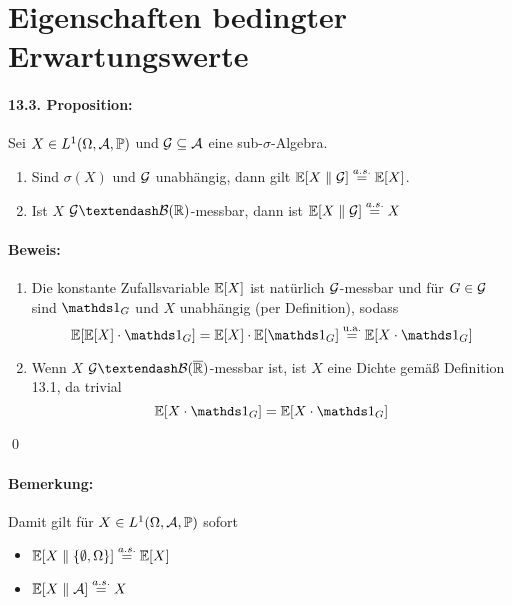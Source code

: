      \section*{Eigenschaften bedingter Erwartungswerte}

     \paragraph{13.3. Proposition:}Sei $X\in L^1(\Omega, \mathcal{A}, \mathbb{P})$ und $\mathcal{G}\subseteq\mathcal{A}$ eine sub-$\sigma$-Algebra.
     \begin{enumerate}[label=(\roman*)]
         \item Sind $\sigma(X)$ und $\mathcal{G}$ unabh\"angig, dann gilt $\mathbb{E}[X\parallel\mathcal{G}]\overset{a.s.}{=}\mathbb{E} [X]$.
         \item Ist $X$ $\G\textendash\mathcal{B}(\R)$-messbar, dann ist $\mathbb{E}[X\parallel\mathcal{G}]\overset{a.s.}{=}X$
     \end{enumerate}
     
     \paragraph{Beweis:}
     \begin{enumerate}[label=(\roman*)]
         \item Die konstante Zufallsvariable $\mathbb{E} [X]$ ist nat\"urlich $\mathcal{G}$-messbar und f\"ur $G\in\mathcal{G}$ sind $\ind{G}$ und $X$ unabh\"angig (per Definition), sodass
         $$\E[\E[X]\cdot\ind{G}]=\E [X]\cdot\E[\ind G]\overset{\text{u.a.}}{=}\E[X\cdot\ind{G}]$$
         \item Wenn $X$ $\G\textendash\mathcal{B}(\overline\R)$-messbar ist, ist $X$ eine Dichte gem\"a\ss{} Definition 13.1, da trivial
         $$\E[X\cdot\ind{G}]=\E[X\cdot\ind{G}]$$
     \end{enumerate}
     \qed
     
     \paragraph{Bemerkung:}Damit gilt f\"ur $X\in L^1(\Omega, \mathcal{A}, \mathbb{P})$ sofort
     \begin{itemize}
         \item $\mathbb{E}[X\parallel\{\emptyset,\Omega\}]\overset{a.s.}{=}\mathbb{E}[X]$
         \item $\mathbb{E}[X\parallel\mathcal{A}]\overset{a.s.}{=}X$
     \end{itemize}
     
